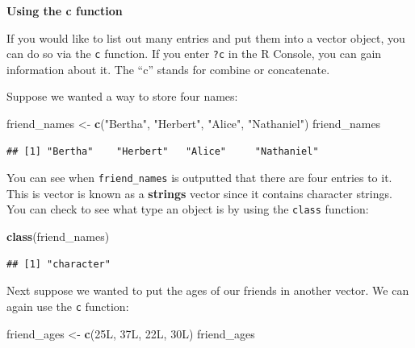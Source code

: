 \documentclass[]{tufte-book}
\newenvironment{Shaded}{\begin{snugshade}}{\end{snugshade}}
\newcommand{\DataTypeTok}[1]{\textcolor[rgb]{0.13,0.29,0.53}{#1}}
\newcommand{\DecValTok}[1]{\textcolor[rgb]{0.00,0.00,0.81}{#1}}
\newcommand{\FunctionTok}[1]{\textcolor[rgb]{0.13,0.29,0.53}{\textbf{#1}}}
\newcommand{\NormalTok}[1]{#1}
\newcommand{\OtherTok}[1]{\textcolor[rgb]{0.56,0.35,0.01}{#1}}
\newcommand{\StringTok}[1]{\textcolor[rgb]{0.31,0.60,0.02}{#1}}
\begin{document}
\vspace*{0.2in}

\noindent\textbf{Using the c function}\vspace*{0.1in}

If you would like to list out many entries and put them into a vector object, you can do so via the \texttt{c} function. If you enter \texttt{?c} in the R Console, you can gain information about it. The ``c'' stands for combine or concatenate.

Suppose we wanted a way to store four names:

\begin{Shaded}
\begin{Highlighting}[]
\NormalTok{friend\_names }\OtherTok{\textless{}{-}} \FunctionTok{c}\NormalTok{(}\StringTok{"Bertha"}\NormalTok{, }\StringTok{"Herbert"}\NormalTok{, }\StringTok{"Alice"}\NormalTok{, }\StringTok{"Nathaniel"}\NormalTok{)}
\NormalTok{friend\_names}
\end{Highlighting}
\end{Shaded}

\begin{verbatim}
## [1] "Bertha"    "Herbert"   "Alice"     "Nathaniel"
\end{verbatim}

You can see when \texttt{friend\_names} is outputted that there are four entries to it. This is vector is known as a \textbf{strings} vector since it contains character strings. You can check to see what type an object is by using the \texttt{class} function:

\begin{Shaded}
\begin{Highlighting}[]
\FunctionTok{class}\NormalTok{(friend\_names)}
\end{Highlighting}
\end{Shaded}

\begin{verbatim}
## [1] "character"
\end{verbatim}

Next suppose we wanted to put the ages of our friends in another vector. We can again use the \texttt{c} function:

\begin{Shaded}
\begin{Highlighting}[]
\NormalTok{friend\_ages }\OtherTok{\textless{}{-}} \FunctionTok{c}\NormalTok{(}\DecValTok{25}\DataTypeTok{L}\NormalTok{, }\DecValTok{37}\DataTypeTok{L}\NormalTok{, }\DecValTok{22}\DataTypeTok{L}\NormalTok{, }\DecValTok{30}\DataTypeTok{L}\NormalTok{)}
\NormalTok{friend\_ages}
\end{Highlighting}
\end{Shaded}
\end{document}
